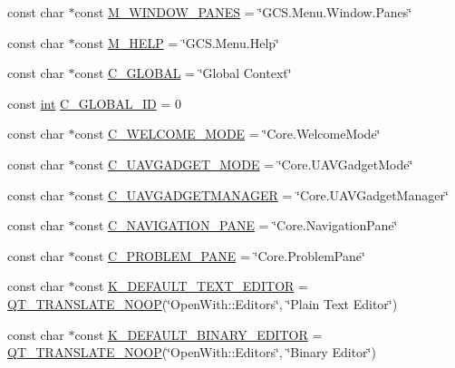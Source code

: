\begin{DoxyCompactItemize}
\item 
const char $\ast$const \hyperlink{group___core_plugin_ga3715751eed82ee62217a73274763bba1}{M\-\_\-\-W\-I\-N\-D\-O\-W\-\_\-\-P\-A\-N\-E\-S} = \char`\"{}G\-C\-S.\-Menu.\-Window.\-Panes\char`\"{}
\item 
const char $\ast$const \hyperlink{group___core_plugin_ga67b5fbe80e9f8a05d1c50c1af7ac39d2}{M\-\_\-\-H\-E\-L\-P} = \char`\"{}G\-C\-S.\-Menu.\-Help\char`\"{}
\item 
const char $\ast$const \hyperlink{group___core_plugin_ga026249c67697bb54937e265ea9099145}{C\-\_\-\-G\-L\-O\-B\-A\-L} = \char`\"{}Global Context\char`\"{}
\item 
const \hyperlink{ioapi_8h_a787fa3cf048117ba7123753c1e74fcd6}{int} \hyperlink{group___core_plugin_ga73bcb9a176a2f5b7cec3008d5b0f244c}{C\-\_\-\-G\-L\-O\-B\-A\-L\-\_\-\-I\-D} = 0
\item 
const char $\ast$const \hyperlink{group___core_plugin_gad0a5b162b3b87854267c5508b62a9346}{C\-\_\-\-W\-E\-L\-C\-O\-M\-E\-\_\-\-M\-O\-D\-E} = \char`\"{}Core.\-Welcome\-Mode\char`\"{}
\item 
const char $\ast$const \hyperlink{group___core_plugin_gac70205e764db3d53257feb7830b1d676}{C\-\_\-\-U\-A\-V\-G\-A\-D\-G\-E\-T\-\_\-\-M\-O\-D\-E} = \char`\"{}Core.\-U\-A\-V\-Gadget\-Mode\char`\"{}
\item 
const char $\ast$const \hyperlink{group___core_plugin_gadcf6598aadc47f352b823e661b5d5a77}{C\-\_\-\-U\-A\-V\-G\-A\-D\-G\-E\-T\-M\-A\-N\-A\-G\-E\-R} = \char`\"{}Core.\-U\-A\-V\-Gadget\-Manager\char`\"{}
\item 
const char $\ast$const \hyperlink{group___core_plugin_ga8a566ff357ef08934d2179d440b638db}{C\-\_\-\-N\-A\-V\-I\-G\-A\-T\-I\-O\-N\-\_\-\-P\-A\-N\-E} = \char`\"{}Core.\-Navigation\-Pane\char`\"{}
\item 
const char $\ast$const \hyperlink{group___core_plugin_gaf36f8799cf16e7fafda4a60a92265bdb}{C\-\_\-\-P\-R\-O\-B\-L\-E\-M\-\_\-\-P\-A\-N\-E} = \char`\"{}Core.\-Problem\-Pane\char`\"{}
\item 
const char $\ast$const \hyperlink{group___core_plugin_ga8fd02192ee4d67c6cfef6f512aa9f080}{K\-\_\-\-D\-E\-F\-A\-U\-L\-T\-\_\-\-T\-E\-X\-T\-\_\-\-E\-D\-I\-T\-O\-R} = \hyperlink{pathchooser_8cpp_a16e29e1b1aa98988fcffee860cd361a3}{Q\-T\-\_\-\-T\-R\-A\-N\-S\-L\-A\-T\-E\-\_\-\-N\-O\-O\-P}(\char`\"{}Open\-With\-::\-Editors\char`\"{}, \char`\"{}Plain Text Editor\char`\"{})
\item 
const char $\ast$const \hyperlink{group___core_plugin_ga6ac6b0dc5b4d900f8854577cccc1e31c}{K\-\_\-\-D\-E\-F\-A\-U\-L\-T\-\_\-\-B\-I\-N\-A\-R\-Y\-\_\-\-E\-D\-I\-T\-O\-R} = \hyperlink{pathchooser_8cpp_a16e29e1b1aa98988fcffee860cd361a3}{Q\-T\-\_\-\-T\-R\-A\-N\-S\-L\-A\-T\-E\-\_\-\-N\-O\-O\-P}(\char`\"{}Open\-With\-::\-Editors\char`\"{}, \char`\"{}Binary Editor\char`\"{})

\end{DoxyCompactItemize}
